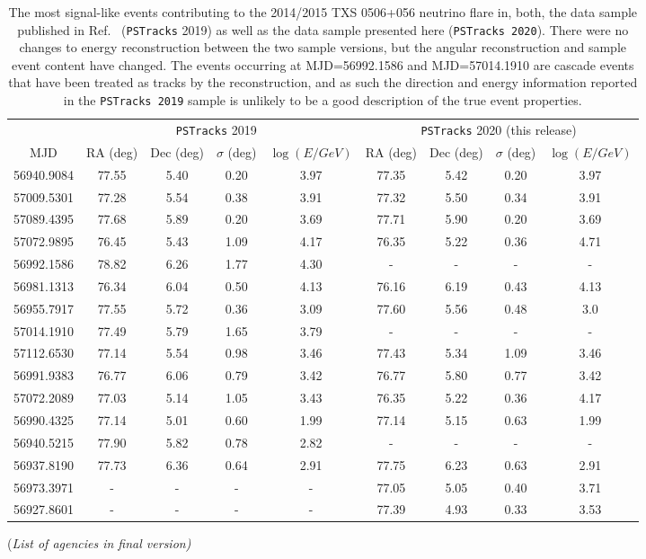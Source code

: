\documentclass[aps,10pt,prd,twocolumn,floats,letterpaper,showpacs,nofootinbib,bibnotes,notitlepage,superscriptaddress,floatfix]{revtex4-1}
\newcommand{\MA}[1]{{\color{magenta}#1}}
\begin{document}
\begin{table}[p]
\centering
\begin{ruledtabular}
\begin{tabular}{c|cccc|cccc}
\multicolumn{1}{c|}{} &
\multicolumn{4}{c|}{{\tt PSTracks} 2019~\cite{IceCube:2018cha,IceCube:2019}} & 
\multicolumn{4}{c}{{\tt PSTracks} 2020 (this release)}\\[0.1cm]
MJD & RA (deg) & Dec (deg) & $\sigma$ (deg) & $\log(E/GeV)$ & RA (deg) & Dec (deg) & $\sigma$ (deg) & $\log(E/GeV)$\\ 
\hline
56940.9084 & 77.55 & 5.40 & 0.20 & 3.97 & 77.35 & 5.42 & 0.20 & 3.97\\
57009.5301 & 77.28 & 5.54 & 0.38 & 3.91 & 77.32 & 5.50 & 0.34 & 3.91\\
57089.4395 & 77.68 & 5.89 & 0.20 & 3.69 & 77.71 & 5.90 & 0.20 & 3.69\\
57072.9895 & 76.45 & 5.43 & 1.09 & 4.17 & 76.35 & 5.22 & 0.36 & 4.71\\
56992.1586 & 78.82 & 6.26 & 1.77 & 4.30 & - & - & - & - \\
56981.1313& 76.34 & 6.04 & 0.50 & 4.13 & 76.16 & 6.19 & 0.43 & 4.13 \\
56955.7917 & 77.55 & 5.72 & 0.36 & 3.09 & 77.60 & 5.56 & 0.48 & 3.0 \\
57014.1910 & 77.49 & 5.79 & 1.65 & 3.79 & - & - & - & -  \\
57112.6530 & 77.14 & 5.54 & 0.98 & 3.46 & 77.43 & 5.34 & 1.09 & 3.46 \\
56991.9383 & 76.77 & 6.06 & 0.79 & 3.42 & 76.77 & 5.80 & 0.77 & 3.42 \\
57072.2089 & 77.03 & 5.14 & 1.05 & 3.43 & 76.35 & 5.22 & 0.36 & 4.17 \\
56990.4325 & 77.14 & 5.01 & 0.60 & 1.99 & 77.14 & 5.15 & 0.63 & 1.99 \\
56940.5215 & 77.90 & 5.82 & 0.78 & 2.82 & - & - & - & - \\
56937.8190 & 77.73 & 6.36 & 0.64 & 2.91 & 77.75 & 6.23 & 0.63 & 2.91 \\
56973.3971 & - & - & - & - & 77.05 & 5.05 & 0.40 & 3.71 \\
56927.8601 & - & - & - & - & 77.39 & 4.93 & 0.33 & 3.53 \\
\end{tabular}
\end{ruledtabular}
\caption[]{The most signal-like events contributing to the 2014/2015 TXS 0506+056 neutrino flare in, both, the data sample published in Ref.~\cite{IceCube:2019} ({\tt PSTracks} 2019) as well as the data sample presented here ({\tt PSTracks 2020}). There were no changes to energy reconstruction between the two sample versions, but the angular reconstruction and sample event content have changed. The events occurring at MJD=56992.1586 and MJD=57014.1910 are cascade events that have been treated as tracks by the reconstruction, and as such the direction and energy information reported in the {\tt PSTracks 2019} sample is unlikely to be a good description of the true event properties.}\label{tab:TXSFlareEvtsTable}
\end{table}

\begin{acknowledgements}
\begin{center}\MA{(\it List of agencies in final version)}\end{center}
%
\end{acknowledgements}




\end{document}

